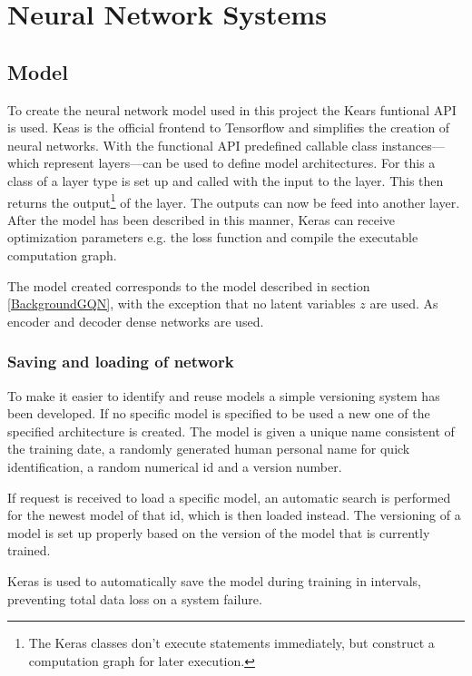 
\chapter{Neural Network Systems}
\section{Model}
To create the neural network model used in this project the Kears funtional API is used. Keas is the official frontend to Tensorflow and simplifies the creation of neural networks. With the functional API predefined callable class instances---which represent layers---can be used to define model architectures. For this a class of a layer type is set up and called with the input to the layer. This then returns the output\footnote{The Keras classes don't execute statements immediately, but construct a computation graph for later execution.} of the layer. The outputs can now be feed into another layer. After the model has been described in this manner, Keras can receive optimization parameters e.g. the loss function and compile the executable computation graph.

The model created corresponds to the model described in section \ref{BackgroundGQN}, with the exception that no latent variables $z$ are used. As encoder and decoder dense networks are used.



\subsection{Saving and loading of network}
To make it easier to identify and reuse models a simple versioning system has been developed. If no specific model is specified to be used a new one of the specified architecture is created. The model is given a unique name consistent of the training date, a randomly generated human personal name for quick identification, a random numerical id and a version number.

If request is received to load a specific model, an automatic search is performed for the newest model of that id, which is then loaded instead. The versioning of a model is set up properly based on the version of the model that is currently trained.

Keras is used to automatically save the model during training in intervals, preventing total data loss on a system failure.


